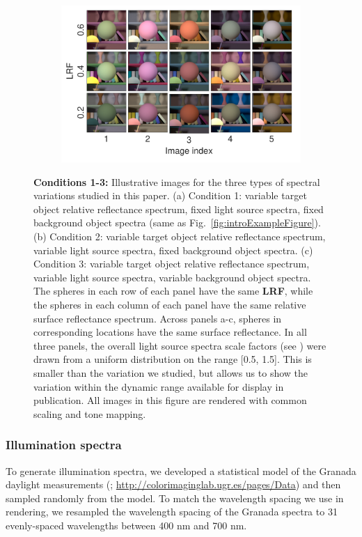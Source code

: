 \documentclass{jov}
\providecommand{\DIFaddtex}[1]{{\bf #1}} %
\providecommand{\DIFdeltex}[1]{} %
\providecommand{\DIFaddFL}[1]{\DIFadd{#1}} %
\providecommand{\DIFdelFL}[1]{\DIFdel{#1}} %
\providecommand{\DIFaddbeginFL}{} %
\providecommand{\DIFaddendFL}{} %
\providecommand{\DIFdelbeginFL}{} %
\providecommand{\DIFdelendFL}{} %
\providecommand{\DIFadd}[1]{\texorpdfstring{\DIFaddtex{#1}}{#1}} %
\providecommand{\DIFdel}[1]{\texorpdfstring{\DIFdeltex{#1}}{}} %
\newcommand{\DIFscaledelfig}{0.5}
\newlength{\DIFdelgraphicswidth} %
\newlength{\DIFdelgraphicsheight} %
\newcommand{\DIFaddincludegraphics}[2][]{{\color{blue}\fbox{\DIFOincludegraphics[#1]{#2}}}} %
\newcommand{\DIFdelincludegraphics}[2][]{%
\sbox{\DIFdelgraphicsbox}{\DIFOincludegraphics[#1]{#2}}%
\settoboxwidth{\DIFdelgraphicswidth}{\DIFdelgraphicsbox} %
\settoboxtotalheight{\DIFdelgraphicsheight}{\DIFdelgraphicsbox} %
\scalebox{\DIFscaledelfig}{%
\parbox[b]{\DIFdelgraphicswidth}{\usebox{\DIFdelgraphicsbox}\\[-\baselineskip] \rule{\DIFdelgraphicswidth}{0em}}\llap{\resizebox{\DIFdelgraphicswidth}{\DIFdelgraphicsheight}{%
\setlength{\unitlength}{\DIFdelgraphicswidth}%
\begin{picture}(1,1)%
\thicklines\linethickness{2pt} %
{\color[rgb]{1,0,0}\put(0,0){\framebox(1,1){}}}%
{\color[rgb]{1,0,0}\put(0,0){\line( 1,1){1}}}%
{\color[rgb]{1,0,0}\put(0,1){\line(1,-1){1}}}%
\end{picture}%
}\hspace*{3pt}}} %
} %
\DeclareRobustCommand{\DIFaddbeginFL}{\DIFOaddbeginFL \let\includegraphics\DIFaddincludegraphics} %
\DeclareRobustCommand{\DIFaddendFL}{\DIFOaddendFL \let\includegraphics\DIFOincludegraphics} %
\DeclareRobustCommand{\DIFdelbeginFL}{\DIFOdelbeginFL \let\includegraphics\DIFdelincludegraphics} %
\DeclareRobustCommand{\DIFdelendFL}{\DIFOaddendFL \let\includegraphics\DIFOincludegraphics} %
\begin{document}
\begin{figure}
\begin{subfigure}{0.33 \textwidth}
        \includegraphics[width=\textwidth]{../FiguresDraft5/Figure5/Figure5_c.pdf}        
        \label{fig:allSpectraVarying}
    \end{subfigure}    
    \caption{{\bf Conditions 1-3:} Illustrative images for the three types of spectral variations studied in this paper. (a) Condition 1: variable target object relative reflectance spectrum, fixed light source spectra, fixed background object spectra (same as Fig.~\ref{fig:introExampleFigure}). 
(b) Condition 2: variable target object relative reflectance spectrum, variable light source spectra, fixed background object spectra. (c) Condition 3: variable target object relative reflectance spectrum, variable light source spectra, variable background object spectra. The spheres in each row of each panel have the same \DIFdelbeginFL \DIFdelFL{LRV}\DIFdelendFL \DIFaddbeginFL \DIFaddFL{LRF}\DIFaddendFL , while the spheres in each column of each panel have the same relative surface reflectance spectrum.  Across panels a-c, spheres in corresponding locations have the same surface reflectance. In all three panels, the overall light source spectra scale factors (see ) were drawn from a uniform distribution on the range [0.5, 1.5]. This is smaller than the variation we studied, but allows us to show the variation within the dynamic range available for display in publication. All images in this figure are rendered with common scaling and tone mapping.} 
\label{fig:studiedCases}
\end{figure}

\subsubsection{Illumination spectra}
To generate illumination spectra, we developed a statistical model of the Granada daylight measurements (; \href{http://colorimaginglab.ugr.es/pages/Data}{http://colorimaginglab.ugr.es/pages/Data}) and then sampled randomly from the model.
To match the wavelength spacing we use in rendering, we resampled the wavelength spacing of the Granada spectra to
31 evenly-spaced wavelengths between 400 nm and 700 nm.
\end{document}
